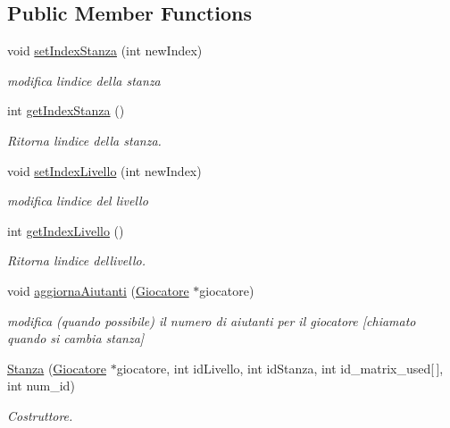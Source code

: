 \subsection*{Public Member Functions}
\begin{DoxyCompactItemize}
\item 
void \hyperlink{classStanza_ab2cf3e8b8ff07d0b2e085e811d4bd877}{set\+Index\+Stanza} (int new\+Index)
\begin{DoxyCompactList}\small\item\em modifica l\textquotesingle{}indice della stanza \end{DoxyCompactList}\item 
\hypertarget{classStanza_acb46dd0c2fd4babf46a3e7df63d686e8}{}int \hyperlink{classStanza_acb46dd0c2fd4babf46a3e7df63d686e8}{get\+Index\+Stanza} ()\label{classStanza_acb46dd0c2fd4babf46a3e7df63d686e8}

\begin{DoxyCompactList}\small\item\em Ritorna l\textquotesingle{}indice della stanza. \end{DoxyCompactList}\item 
void \hyperlink{classStanza_a4fa142675917f53dfe48ce5fa1106efc}{set\+Index\+Livello} (int new\+Index)
\begin{DoxyCompactList}\small\item\em modifica l\textquotesingle{}indice del livello \end{DoxyCompactList}\item 
\hypertarget{classStanza_acc5183dd818e4e84d55a67a0c0e15c29}{}int \hyperlink{classStanza_acc5183dd818e4e84d55a67a0c0e15c29}{get\+Index\+Livello} ()\label{classStanza_acc5183dd818e4e84d55a67a0c0e15c29}

\begin{DoxyCompactList}\small\item\em Ritorna l\textquotesingle{}indice dellivello. \end{DoxyCompactList}\item 
void \hyperlink{classStanza_a2f712f06413ec65a642c03022b02d292}{aggiorna\+Aiutanti} (\hyperlink{classGiocatore}{Giocatore} $\ast$giocatore)
\begin{DoxyCompactList}\small\item\em modifica (quando possibile) il numero di aiutanti per il giocatore \mbox{[}chiamato quando si cambia stanza\mbox{]} \end{DoxyCompactList}\item 
\hyperlink{classStanza_aebe5bf4edcd60661ebe64fba556e8336}{Stanza} (\hyperlink{classGiocatore}{Giocatore} $\ast$giocatore, int id\+Livello, int id\+Stanza, int id\+\_\+matrix\+\_\+used\mbox{[}$\,$\mbox{]}, int num\+\_\+id)
\begin{DoxyCompactList}\small\item\em Costruttore. \end{DoxyCompactList}\end{DoxyCompactItemize}
